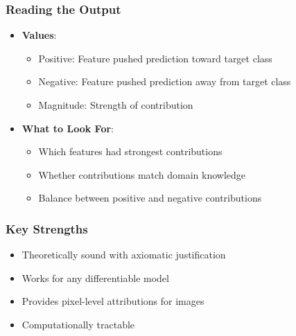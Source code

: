 \documentclass{article}
\begin{document}
\subsubsection{Reading the Output}
\begin{itemize}
    \item \textbf{Values}:
        \begin{itemize}
            \item Positive: Feature pushed prediction toward target class
            \item Negative: Feature pushed prediction away from target class
            \item Magnitude: Strength of contribution
        \end{itemize}
    \item \textbf{What to Look For}:
        \begin{itemize}
            \item Which features had strongest contributions
            \item Whether contributions match domain knowledge
            \item Balance between positive and negative contributions
        \end{itemize}
\end{itemize}

\subsubsection{Key Strengths}
\begin{itemize}
    \item Theoretically sound with axiomatic justification
    \item Works for any differentiable model
    \item Provides pixel-level attributions for images
    \item Computationally tractable
\end{itemize}
\end{document}
